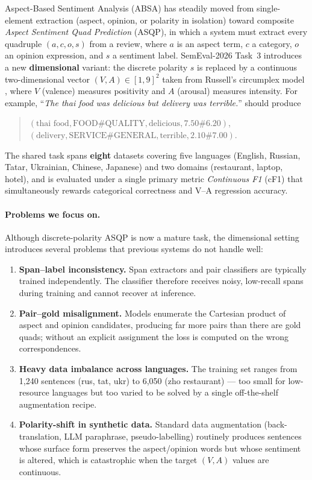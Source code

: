 \documentclass[11pt]{article}
\begin{document}
Aspect-Based Sentiment Analysis (ABSA) has steadily moved from
single-element extraction (aspect, opinion, or polarity in isolation)
toward composite \emph{Aspect Sentiment Quad Prediction} (ASQP), in
which a system must extract every quadruple
$(a, c, o, s)$ from a review, where $a$ is an aspect term, $c$ a
category, $o$ an opinion expression, and $s$ a sentiment label.
SemEval-2026 Task~3 \cite{dimabsa2026} introduces a new
\textbf{dimensional} variant: the discrete polarity $s$ is replaced by
a continuous two-dimensional vector $(V, A) \in [1,9]^2$ taken from
Russell's circumplex model \cite{russell1980circumplex}, where $V$
(valence) measures positivity and $A$ (arousal) measures intensity.
For example, ``\textit{The thai food was delicious but delivery was
terrible.}'' should produce
\begin{quote}\small
$(\text{thai food}, \text{FOOD\#QUALITY}, \text{delicious}, 7.50\#6.20)$,\\
$(\text{delivery}, \text{SERVICE\#GENERAL}, \text{terrible}, 2.10\#7.00)$.
\end{quote}
The shared task spans \textbf{eight} datasets covering five languages
(English, Russian, Tatar, Ukrainian, Chinese, Japanese) and two domains
(restaurant, laptop, hotel), and is evaluated under a single primary
metric \emph{Continuous F1} (cF1) that simultaneously rewards
categorical correctness and V--A regression accuracy.

\paragraph{Problems we focus on.}
Although discrete-polarity ASQP is now a mature task, the dimensional
setting introduces several problems that previous systems do not
handle well:
\begin{enumerate}[itemsep=2pt,topsep=2pt,leftmargin=*]
  \item \textbf{Span--label inconsistency.} Span extractors and pair
    classifiers are typically trained independently. The classifier
    therefore receives noisy, low-recall spans during training and
    cannot recover at inference.
  \item \textbf{Pair--gold misalignment.} Models enumerate the
    Cartesian product of aspect and opinion candidates, producing far
    more pairs than there are gold quads; without an explicit
    assignment the loss is computed on the wrong correspondences.
  \item \textbf{Heavy data imbalance across languages.} The training
    set ranges from 1{,}240 sentences (rus, tat, ukr) to 6{,}050 (zho
    restaurant) — too small for low-resource languages but too varied
    to be solved by a single off-the-shelf augmentation recipe.
  \item \textbf{Polarity-shift in synthetic data.} Standard data
    augmentation (back-translation, LLM paraphrase, pseudo-labelling)
    routinely produces sentences whose surface form preserves the
    aspect/opinion words but whose sentiment is altered, which is
    catastrophic when the target $(V, A)$ values are continuous.
\end{enumerate}
\end{document}
